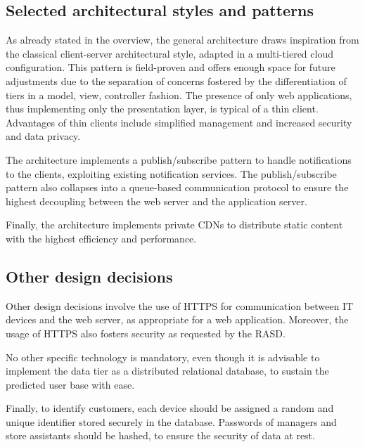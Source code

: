 \documentclass[../../main.tex]{subfiles}
\begin{document}
\subsection{Selected architectural styles and patterns}

    As already stated in the overview, the general architecture draws inspiration from the classical client-server architectural style, adapted in a multi-tiered cloud configuration.  
    This pattern is field-proven and offers enough space for future adjustments due to the separation of concerns fostered by the differentiation of tiers in a model, view, controller fashion.
    The presence of only web applications, thus implementing only the presentation layer, is typical of a thin client. Advantages of thin clients include simplified management and 
    increased security and data privacy.

    The architecture implements a publish/subscribe pattern to handle notifications to the clients, exploiting existing notification services. 
    The publish/subscribe pattern also collapses into a queue-based communication protocol to ensure the highest decoupling between the web server and the application server.

    Finally, the architecture implements private CDNs to distribute static content with the highest efficiency and performance.


\subsection{Other design decisions}

    Other design decisions involve the use of HTTPS for communication between IT devices and the web server, as appropriate for a web application. Moreover, 
    the usage of HTTPS also fosters security as requested by the RASD.

    No other specific technology is mandatory, even though it is advisable to implement the data tier as a distributed relational database, to sustain the predicted user base with ease.

    Finally, to identify customers, each device should be assigned a random and unique identifier stored securely in the database. 
    Passwords of managers and store assistants should be hashed, to ensure the security of data at rest.
\end{document}

